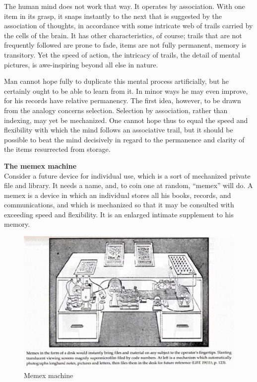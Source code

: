 \documentclass[]{book}
\theoremstyle{definition}
\theoremstyle{definition}
\theoremstyle{definition}
\theoremstyle{remark}
\begin{document}
The human mind does not work that way. It operates by association. With
one item in its grasp, it snaps instantly to the next that is suggested
by the association of thoughts, in accordance with some intricate web of
trails carried by the cells of the brain. It has other characteristics,
of course; trails that are not frequently followed are prone to fade,
items are not fully permanent, memory is transitory. Yet the speed of
action, the intricacy of trails, the detail of mental pictures, is
awe-inspiring beyond all else in nature.

Man cannot hope fully to duplicate this mental process artificially, but
he certainly ought to be able to learn from it. In minor ways he may
even improve, for his records have relative permanency. The first idea,
however, to be drawn from the analogy concerns selection. Selection by
association, rather than indexing, may yet be mechanized. One cannot
hope thus to equal the speed and flexibility with which the mind follows
an associative trail, but it should be possible to beat the mind
decisively in regard to the permanence and clarity of the items
resurrected from storage.

\textbf{The memex machine}\\
Consider a future device for individual use, which is a sort of
mechanized private file and library. It needs a name, and, to coin one
at random, ``memex'' will do. A memex is a device in which an individual
stores all his books, records, and communications, and which is
mechanized so that it may be consulted with exceeding speed and
flexibility. It is an enlarged intimate supplement to his memory.

\begin{figure}
\centering
\includegraphics{bush-memex.png}
\caption{Memex machine}
\end{figure}
\end{document}
